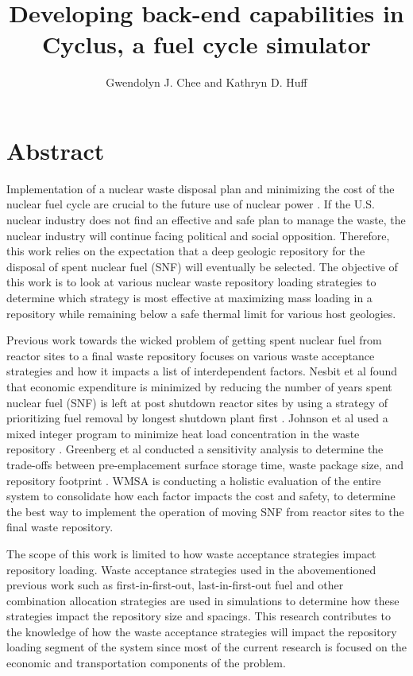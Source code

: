 \documentclass{anstrans}
\title{Developing back-end capabilities in Cyclus, a fuel cycle simulator}
\author{Gwendolyn J. Chee and Kathryn D. Huff}
\institute{
    Dept. of Nuclear, Plasma and Radiological Engineering, University of Illinois at Urbana-Champaign \\
    gchee2@illinois.edu
    }
\begin{document}
    \section{Abstract}
    Implementation of a nuclear waste disposal plan and minimizing the cost of the 
    nuclear fuel cycle are crucial to the future use of nuclear power 
    \cite{massachusetts_institute_of_technology_future_2003}. 
    If the U.S. nuclear industry does not find an effective and safe plan to manage 
    the waste, the nuclear industry will continue facing political and social 
    opposition. 
    Therefore, this work relies on the expectation that a deep geologic repository 
    for the disposal of spent nuclear fuel (SNF) will eventually be selected. 
    The objective of this work is to look at various nuclear waste repository loading 
    strategies to determine which strategy is most effective at maximizing 
    mass loading in a repository while remaining below a safe thermal limit 
    for various host geologies. 
    
    Previous work towards the wicked problem of getting spent nuclear fuel from reactor 
    sites to a final waste repository focuses on various waste acceptance strategies 
    and how it impacts a list of interdependent factors. 
    Nesbit et al found that economic expenditure is minimized by reducing the 
    number of years spent nuclear fuel (SNF) is left at post shutdown reactor 
    sites by using a strategy of prioritizing fuel removal by longest shutdown plant 
    first \cite{nesbit_proposed_2015}. 
    Johnson et al used a mixed integer program to minimize heat load concentration 
    in the waste repository \cite{johnson_optimizing_2016}. 
    Greenberg et al conducted a sensitivity analysis to determine the trade-offs 
    between pre-emplacement surface storage time, waste package size, and repository 
    footprint \cite{greenberg_application_2012}. 
    WMSA is conducting a holistic evaluation of the entire system to consolidate 
    how each factor impacts the cost and safety, to determine the best 
    way to implement the operation of moving SNF from reactor sites to the final 
    waste repository\cite{nutt_waste_2015}. 
    
    The scope of this work is limited to how waste acceptance strategies impact 
    repository loading. 
    Waste acceptance strategies used in the abovementioned previous work such as 
    first-in-first-out, last-in-first-out fuel and other combination allocation 
    strategies are used in simulations to determine how these strategies impact 
    the repository size and spacings. 
    This research contributes to the knowledge of how the waste acceptance 
    strategies will impact the repository loading segment of the system since 
    most of the current research is focused on the economic and transportation 
    components of the problem. 
    
\end{document}

